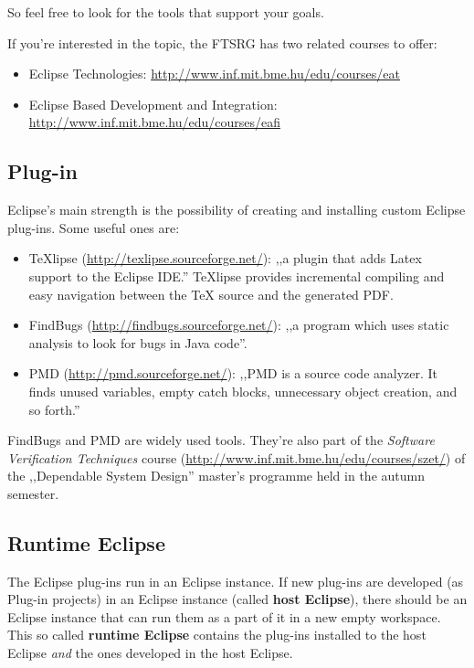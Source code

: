 \documentclass[]{report}
\begin{document}
So feel free to look for the tools that support your goals.

If you're interested in the topic, the FTSRG has two related courses to
offer:

\begin{itemize}
\itemsep1pt\parskip0pt
\item
  Eclipse Technologies: \url{http://www.inf.mit.bme.hu/edu/courses/eat}
\item
  Eclipse Based Development and Integration:
  \url{http://www.inf.mit.bme.hu/edu/courses/eafi}
\end{itemize}

\subsection{Plug-in}

Eclipse's main strength is the possibility of creating and installing
custom Eclipse plug-ins. Some useful ones are:

\begin{itemize}
\itemsep1pt\parskip0pt
\item
  TeXlipse (\url{http://texlipse.sourceforge.net/}): ,,a plugin that
  adds Latex support to the Eclipse IDE.'' TeXlipse provides incremental
  compiling and easy navigation between the TeX source and the generated
  PDF.
\item
  FindBugs (\url{http://findbugs.sourceforge.net/}): ,,a program which
  uses static analysis to look for bugs in Java code''.
\item
  PMD (\url{http://pmd.sourceforge.net/}): ,,PMD is a source code
  analyzer. It finds unused variables, empty catch blocks, unnecessary
  object creation, and so forth.''
\end{itemize}

FindBugs and PMD are widely used tools. They're also part of the
\emph{Software Verification Techniques} course
(\url{http://www.inf.mit.bme.hu/edu/courses/szet/}) of the ,,Dependable
System Design'' master's programme held in the autumn semester.

\subsection{Runtime Eclipse}

The Eclipse plug-ins run in an Eclipse instance. If new plug-ins are
developed (as Plug-in projects) in an Eclipse instance (called
\textbf{host Eclipse}), there should be an Eclipse instance that can run
them as a part of it in a new empty workspace. This so called
\textbf{runtime Eclipse} contains the plug-ins installed to the host
Eclipse \emph{and} the ones developed in the host Eclipse.
\end{document}
